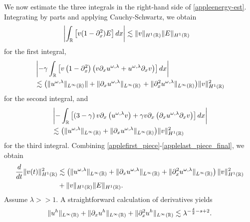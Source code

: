 %
%
We now estimate the three integrals in the right-hand side of 
\eqref{appleenergy-est}. Integrating by parts and applying Cauchy-Schwartz,  
we obtain
%
%
%
\begin{equation}
	\begin{split}
\label{applefirst_piece}
& \left |\int_{\mathbb{R}} \left [v (1- \partial_x^2)E \right ] dx \right |
 \lesssim
\|v\|_{H^1(\mathbb{R})} \|E\|_{H^1(\mathbb{R})}
\end{split}
\end{equation}
for the first integral,
%
%
\begin{equation}
	\begin{split}
\label{applesecond-piece-final}
& \left | -\gamma \int_{\mathbb{R}}
\left[ v\left( 1-\partial_x^2 \right)\left( v \partial_x u^{\omega,\lambda} + 
u^{\omega,\lambda} \partial_x v
\right) \right] dx \right |
\\
& \lesssim \left( \|u^{\omega,\lambda}\|_{L^\infty(\mathbb{R})}\| + \|\partial_x 
u^{\omega,\lambda}
\|_{L^\infty(\mathbb{R})} \right .  + \|\partial_x^2 u^{\omega,\lambda} 
\|_{L^\infty(\mathbb{R})}
\big )\|v\|_{H^1(\mathbb{R})}^2
\end{split}
\end{equation}
for the second integral, and
\begin{equation}
	\begin{split}
\label{applelast_piece_final}
& \left | -\int_{\mathbb{R}} \left[ \left( 3-\gamma \right)v
\partial_x \left( u^{\omega,\lambda} v \right) + \gamma
v \partial_x \left( \partial_x u^{\omega,\lambda} \partial_x v \right)\right]dx \right |
\\
& \lesssim \big(
\|u^{\omega,\lambda}\|_{L^\infty(\mathbb{R})}
+ \|\partial_x u^{\omega,\lambda} \|_{L^\infty(\mathbb{R})} \big)
\|v\|_{H^1(\mathbb{R})}^2
\end{split}
\end{equation}
%
%
%
for the third integral. Combining 
\eqref{applefirst_piece}-\eqref{applelast_piece_final}, we 
obtain
%
%
\begin{equation}
\begin{split}
\label{appleenergy-estimate-best}
\frac{d}{dt} \|v(t)\|_{H^1(\mathbb{R})}^2
& \lesssim \left( \|u^{\omega,\lambda}\|_{L^\infty(\mathbb{R})} + \|
\partial_x u^{\omega,\lambda} \|_{L^\infty(\mathbb{R})} + \|\partial_x^2 u^{\omega,\lambda} 
\|_{L^\infty (\mathbb{R})} \right)
\|v\|_{H^1(\mathbb{R})}^2 \\
&+ \|v\|_{H^1(\mathbb{R})} \|E\|_{H^1(\mathbb{R})}.
\end{split}
\end{equation}
%
%
Assume $\lambda >>1$. A straightforward calculation of derivatives yields
%
%
\begin{equation*}
\begin{split}
\|u^h\|_{L^\infty(\mathbb{R})} + \|\partial_x u^h\|_{L^\infty(\mathbb{R})} + \|\partial_x^2
u^h\|_{L^\infty(\mathbb{R})} \lesssim \lambda^{- \frac{\delta}{2} - s +2 }.
\label{apple53}
\end{split}
\end{equation*}
